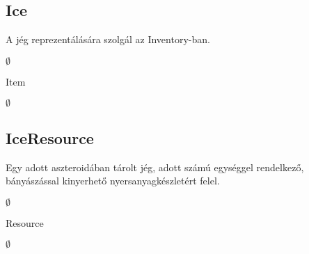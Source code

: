 \subsection{Ice}
\begin{class-template-responsibility}
A jég reprezentálására szolgál az Inventory-ban.
\end{class-template-responsibility}
\begin{class-template-interface}
$\emptyset$
\end{class-template-interface}
\begin{class-template-baseclass}
Item
\end{class-template-baseclass}
\begin{class-template-attribute}
\item[] $\emptyset$
\end{class-template-attribute}
\begin{class-template-method}
\end{class-template-method}


\subsection{IceResource}
\begin{class-template-responsibility}
Egy adott aszteroidában tárolt jég, adott számú egységgel rendelkező, bányászással kinyerhető nyersanyagkészletért felel. 
\end{class-template-responsibility}
\begin{class-template-interface}
$\emptyset$
\end{class-template-interface}
\begin{class-template-baseclass}
Resource
\end{class-template-baseclass}
\begin{class-template-attribute}
\item[] $\emptyset$
\end{class-template-attribute}
\begin{class-template-method}
\end{class-template-method}


